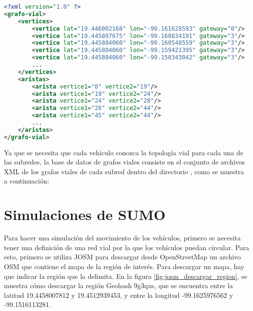 \begin{lstlisting}[language=XML]
<?xml version="1.0" ?>
<grafo-vial>
    <vertices>
        <vertice lat="19.446002168" lon="-99.161628593" gateway="0"/>
        <vertice lat="19.445807675" lon="-99.160834191" gateway="3"/>
        <vertice lat="19.445804060" lon="-99.160548559" gateway="3"/>
        <vertice lat="19.445804060" lon="-99.159421395" gateway="3"/>
        <vertice lat="19.445804060" lon="-99.158343042" gateway="3"/>
        ...
    </vertices>
    <aristas>
        <arista vertice1="0" vertice2="19"/>
        <arista vertice1="19" vertice2="24"/>
        <arista vertice1="24" vertice2="28"/>
        <arista vertice1="28" vertice2="44"/>
        <arista vertice1="45" vertice2="44"/>
        ...
    </aristas>
</grafo-vial>
\end{lstlisting}

Ya que se necesita que cada vehículo conozca la topología vial para cada una de
las subredes, la base de datos de grafos viales consiste en el conjunto de
archivos XML de los grafos viales de cada subred dentro del directorio
, como se muestra a continuación:



\section{Simulaciones de SUMO}

\label{sec:simulaciones_sumo}

Para hacer una simulación del movimiento de los vehículos, primero se necesita
tener una definición de una red vial por la que los vehículos puedan circular.
Para esto, primero se utiliza JOSM para descargar desde OpenStreetMap un
archivo OSM que contiene el mapa de la región de interés. Para descargar un
mapa, hay que indicar la región que la delimita. En la figura
\ref{fig:josm_descargar_region}, se muestra cómo descargar la región Geohash
9g3qxs, que se encuentra entre la latitud 19.4458007812 y 19.4512939453, y
entre la longitud -99.1625976562 y -99.1516113281.

